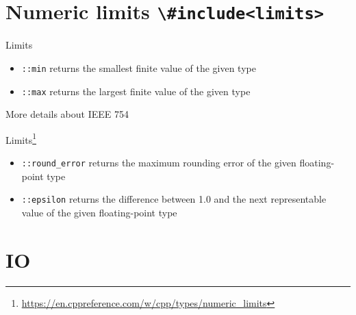 \documentclass[12pt,t]{beamer}
\begin{document}
\section{Numeric limits \lstinline|\#include<limits>|}

\begin{frame}{Limits}



\begin{itemize}
\item \lstinline|::min| returns the smallest finite value of the given type 
\item \lstinline|::max| returns the largest finite value of the given type 
\end{itemize}
More details about IEEE 754~\cite{goldberg1991every,4610935}
\end{frame}


\begin{frame}{Limits\footnote{\tiny\url{https://en.cppreference.com/w/cpp/types/numeric_limits}}}



\begin{itemize}
\item \lstinline|::round_error| returns the maximum rounding error of the given floating-point type  
\item \lstinline|::epsilon| returns the difference between 1.0 and the next representable value of the given floating-point type 
\end{itemize}

\end{frame}

\section{IO}
\end{document}
